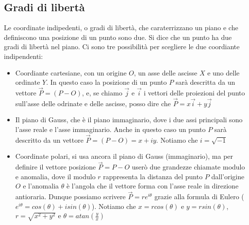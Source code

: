 \subsection{Gradi di libertà}
Le coordinate indipedenti, o gradi di libertà, che caraterrizzano un piano e che definiscono una posizione di un punto sono due. Si dice che un punto ha due gradi di libertà nel piano.\newline
Ci sono tre possibilità per scegliere le due coordiante indipendenti:
\begin{itemize}
    \item Coordiante cartesiane, con un origine $O$, un asse delle ascisse $X$ e uno delle ordinate $Y$. In questo caso la posizione di un punto $P$ sarà descritta da un vettore $\vec{P} = (P-O)$, e, se chiamo $\vec{j}$ e $\vec{i}$ i vettori delle proiezioni del punto sull'asse delle odrinate e delle ascisse, posso dire che $\vec{P} = x \vec{i} + y \vec{j}$
    \item Il piano di Gauss, che è il piano immaginario, dove i due assi principali sono l'asse reale e l'asse immaginario. Anche in questo caso un punto $P$ sarà descritto da un vettore $\vec{P} = (P - O) = x + iy$. Notiamo che $i = \sqrt{-1}$
    \item Coordinate polari, si usa ancora il piano di Gauss (immaginario), ma per definire il vettore posizione $\vec{P} = P - O$ userò due grandezze chiamate modulo e anomalia, dove il modulo $r$ rappresenta la distanza del punto $P$ dall'origine $O$ e l'anomalia $\theta$ è l'angola che il vettore forma con l'asse reale in direzione antioraria. Dunque possiamo scrivere $\vec{P} = r e^{i \theta}$ grazie alla formula di Eulero ($e^{i \theta} = cos(\theta)+  i sin(\theta)$). Notiamo che $x =r cos(\theta) $ e $y = r sin(\theta)$, $r = \sqrt{x^2 + y^2}$ e $\theta = atan\left( \frac{y}{x} \right)$
\end{itemize}
